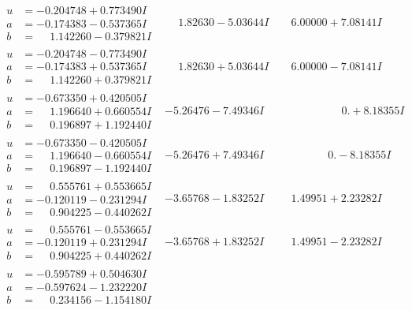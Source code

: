 \documentclass[1p]{elsarticle_modified}
\theoremstyle{definition}
\begin{document}
$$\begin{array}{c|c|c}
\begin{aligned}
u &= -0.204748 + 0.773490 I \\
a &= -0.174383 - 0.537365 I \\
b &= \phantom{-}1.142260 - 0.379821 I\end{aligned}
 & \phantom{-}1.82630 - 5.03644 I & \phantom{-}6.00000 + 7.08141 I \\ \hline\begin{aligned}
u &= -0.204748 - 0.773490 I \\
a &= -0.174383 + 0.537365 I \\
b &= \phantom{-}1.142260 + 0.379821 I\end{aligned}
 & \phantom{-}1.82630 + 5.03644 I & \phantom{-}6.00000 - 7.08141 I \\ \hline\begin{aligned}
u &= -0.673350 + 0.420505 I \\
a &= \phantom{-}1.196640 + 0.660554 I \\
b &= \phantom{-}0.196897 + 1.192440 I\end{aligned}
 & -5.26476 - 7.49346 I & \phantom{-0.000000 -}0. + 8.18355 I \\ \hline\begin{aligned}
u &= -0.673350 - 0.420505 I \\
a &= \phantom{-}1.196640 - 0.660554 I \\
b &= \phantom{-}0.196897 - 1.192440 I\end{aligned}
 & -5.26476 + 7.49346 I & \phantom{-0.000000 } 0. - 8.18355 I \\ \hline\begin{aligned}
u &= \phantom{-}0.555761 + 0.553665 I \\
a &= -0.120119 - 0.231294 I \\
b &= \phantom{-}0.904225 - 0.440262 I\end{aligned}
 & -3.65768 - 1.83252 I & \phantom{-}1.49951 + 2.23282 I \\ \hline\begin{aligned}
u &= \phantom{-}0.555761 - 0.553665 I \\
a &= -0.120119 + 0.231294 I \\
b &= \phantom{-}0.904225 + 0.440262 I\end{aligned}
 & -3.65768 + 1.83252 I & \phantom{-}1.49951 - 2.23282 I \\ \hline\begin{aligned}
u &= -0.595789 + 0.504630 I \\
a &= -0.597624 - 1.232220 I \\
b &= \phantom{-}0.234156 - 1.154180 I\end{aligned}

\end{array}$$
\end{document}
